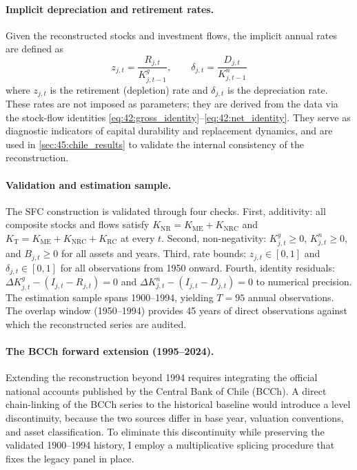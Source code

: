 \paragraph{Implicit depreciation and retirement rates.}
Given the reconstructed stocks and investment flows, the implicit
annual rates are defined as
\begin{equation}
	z_{j,t} = \frac{R_{j,t}}{K^{g}_{j,t-1}},
	\qquad
	\delta_{j,t} = \frac{D_{j,t}}{K^{n}_{j,t-1}}
	\label{eq:42:implicit_rates}
\end{equation}
where $z_{j,t}$ is the retirement (depletion) rate and
$\delta_{j,t}$ is the depreciation rate. These rates are not
imposed as parameters; they are derived from the data via the
stock-flow identities
\eqref{eq:42:gross_identity}--\eqref{eq:42:net_identity}. They
serve as diagnostic indicators of capital durability and
replacement dynamics, and are used in
\cref{sec:45:chile_results} to validate the internal consistency of
the reconstruction.

\paragraph{Validation and estimation sample.}
The SFC construction is validated through four checks. First,
additivity: all composite stocks and flows satisfy
$K_{\text{NR}} = K_{\text{ME}} + K_{\text{NRC}}$ and
$K_{\text{T}} = K_{\text{ME}} + K_{\text{NRC}} + K_{\text{RC}}$
at every $t$. Second, non-negativity: $K^{g}_{j,t} \geq 0$,
$K^{n}_{j,t} \geq 0$, and $B_{j,t} \geq 0$ for all assets and
years. Third, rate bounds: $z_{j,t} \in [0,1]$ and
$\delta_{j,t} \in [0,1]$ for all observations from 1950 onward.
Fourth, identity residuals: $\Delta K^{g}_{j,t} - (I_{j,t} -
R_{j,t}) = 0$ and $\Delta K^{n}_{j,t} - (I_{j,t} - D_{j,t}) = 0$
to numerical precision. The estimation sample spans 1900--1994,
yielding $T = 95$ annual observations. The overlap window
(1950--1994) provides 45 years of direct \citet{Hofman2000b}
observations against which the reconstructed series are audited.

\paragraph{The BCCh forward extension (1995--2024).}
Extending the reconstruction beyond 1994 requires integrating the
official national accounts published by the Central Bank of Chile
(BCCh). A direct chain-linking of the BCCh series to the historical
baseline would introduce a level discontinuity, because the two
sources differ in base year, valuation conventions, and asset
classification. To eliminate this discontinuity while preserving the
validated 1900--1994 history, I employ a multiplicative splicing
procedure that fixes the legacy panel in place.

